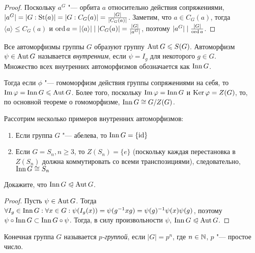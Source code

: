 \begin{proof}
	Поскольку $a^G$ "--- орбита $a$ относительно действия сопряжениями, $|a^G| \hm= |G : \St(a)| = |G : C_G(a)| = \frac{|G|}{|C_G(a)|}$. Заметим, что $a \in C_G(a)$, тогда $\langle a \rangle \le C_G(a)$ и $\ord{a} \hm= |\langle a \rangle| \mid |C_G(a)| = \frac{|G|}{|a^G|}$, поэтому $|a^G| \mid \frac{|G|}{\operatorname{ord} a}$.
\end{proof}

\begin{definition}
	Все автоморфизмы группы $G$ образуют группу $\operatorname{Aut} G \leqslant S(G)$. Автоморфизм $\psi \in \operatorname{Aut} G$ называется \textit{внутренним}, если $\psi = I_g$ для некоторого $g \in G$. Множество всех внутренних автоморфизмов обозначается как $\operatorname{Inn} G$.
\end{definition}

\begin{note}
	Тогда если $\phi$ "--- гомоморфизм действия группы сопряжениями на себя, то $\im\phi \hm= \Inn G \le \Aut G$. Более того, поскольку $\operatorname{Im}\varphi = \operatorname{Inn} G$ и $\operatorname{Ker}\varphi = Z(G)$, то, по основной теореме о гомоморфизме, $\operatorname{Inn} G \cong G / Z(G)$.
\end{note}

\begin{example}
	Рассотрим несколько примеров внутренних автоморфизмов:
	\begin{enumerate}
		\item Если группа $G$ "--- абелева, то $\operatorname{Inn}{G} = \{\operatorname{id}\}$
		\item Если $G = S_n, n \ge 3$, то $Z(S_n) = \{e\}$ (поскольку каждая перестановка в $Z(S_n)$ должна коммутировать со всеми транспозициями), следовательно, $\operatorname{Inn}{G} \cong S_n$
	\end{enumerate}
\end{example}

\begin{exercise}
	Докажите, что $\operatorname{Inn}{G} \trianglelefteqslant \operatorname{Aut}{G}$.
\end{exercise}

\begin{proof}
	Пусть $\psi \in \operatorname{Aut}{G}$. Тогда $\forall I_g \in \Inn{G}: \forall x \hm\in G: \psi(I_g(x)) = \psi(g^{-1}xg) \hm= \psi(g)^{-1}\psi(x)\psi(g)$, поэтому $\psi\circ\operatorname{Inn}{G} \subset \operatorname{Inn}{G}\circ\psi$. Тогда, в силу произвольности $\psi$, $\Inn{G} \hm\normal \Aut{G}$.
\end{proof}

\begin{definition}
	Конечная группа $G$ называется \textit{$p$-группой}, если $|G| = p^n$, где $n \in \mathbb{N}$, $p$ "--- простое число.
\end{definition}


